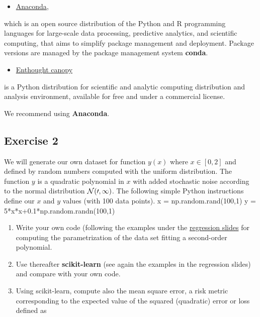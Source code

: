\documentclass[%
oneside,                 %
final,                   %
10pt]{article}
\begin{document}
\begin{itemize}
\item \href{{https://docs.anaconda.com/}}{Anaconda}, 
\end{itemize}

\noindent
which is an open source
distribution of the Python and R programming languages for large-scale
data processing, predictive analytics, and scientific computing, that
aims to simplify package management and deployment. Package versions
are managed by the package management system \textbf{conda}. 

\begin{itemize}
\item \href{{https://www.enthought.com/product/canopy/}}{Enthought canopy} 
\end{itemize}

\noindent
is a Python
distribution for scientific and analytic computing distribution and
analysis environment, available for free and under a commercial
license.

We recommend using \textbf{Anaconda}.

\subsection{Exercise 2}

We will generate our own dataset for function $y(x)$ where $x \in [0,2]$ and defined by random numbers computed with the uniform distribution. The function $y$ is a quadratic polynomial in $x$ with added stochastic noise according to the normal distribution $\cal {N}(0,1)$.
The following simple Python instructions define our $x$ and $y$ values (with 100 data points).
\bpycod
x = np.random.rand(100,1)
y = 5*x*x+0.1*np.random.randn(100,1)
\epycod

\begin{enumerate}
\item Write your own code (following the examples under the \href{{https://compphysics.github.io/MachineLearning/doc/pub/Regression/html/Regression-bs.html}}{regression slides} for computing the parametrization of the data set fitting a second-order polynomial. 

\item Use thereafter \textbf{scikit-learn} (see again the examples in the regression slides) and compare with your own code.   

\item Using scikit-learn, compute also the mean square error, a risk metric corresponding to the expected value of the squared (quadratic) error or loss defined as
\end{enumerate}
\end{document}
